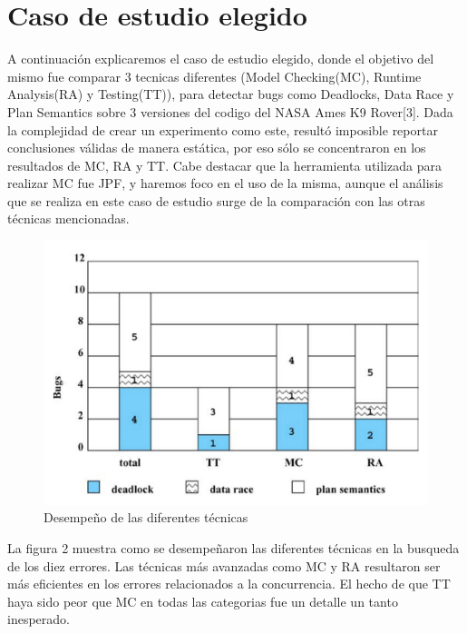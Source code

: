 \documentclass[runningheads]{llncs}
\begin{document}
\section{Caso de estudio elegido}
A continuaci\'on explicaremos el caso de estudio elegido, donde el objetivo del mismo fue comparar 3 tecnicas diferentes (Model Checking(MC), Runtime Analysis(RA) y Testing(TT)), para detectar bugs como Deadlocks, Data Race y Plan Semantics sobre 3 versiones del codigo del NASA Ames K9 Rover[3].
Dada la complejidad de crear un experimento como este, result\'o imposible reportar conclusiones v\'alidas de manera est\'atica, por eso s\'olo se concentraron en los resultados de MC, RA y TT. Cabe destacar que la herramienta utilizada para realizar MC fue JPF, y haremos foco en el uso de la misma, aunque el an\'alisis que se realiza en este caso de estudio surge de la comparaci\'on con las otras t\'ecnicas mencionadas.

\begin{figure}[H]
\centering
\includegraphics[scale=0.5]{fig2.png}
\caption{Desempe\~no de las diferentes t\'ecnicas} \label{fig2}
\end{figure}
La figura 2 muestra como se desempe\~naron las diferentes t\'ecnicas en la busqueda de los diez errores. Las t\'ecnicas m\'as avanzadas como MC y RA resultaron ser m\'as eficientes en los errores relacionados a la concurrencia. El hecho de que TT haya sido peor que MC en todas las categorias fue un detalle un tanto inesperado.\\
\end{document}
